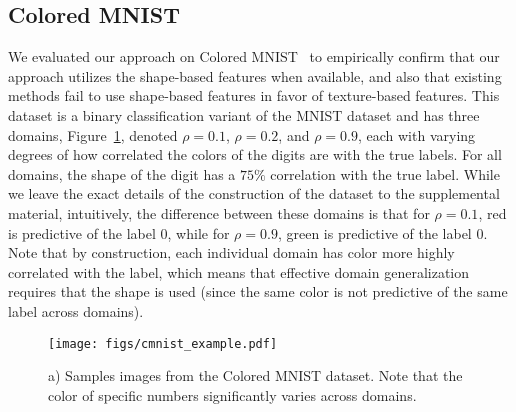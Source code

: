 


















































\subsection{Colored MNIST}

We evaluated our approach on Colored MNIST~\cite{Arjovsky:etal:ARXIV20, Gulrajani:etal:ARXIV20} to empirically confirm that our approach utilizes the shape-based features when available, and also that existing methods fail to use shape-based features in favor of texture-based features. This dataset is a binary classification variant of the MNIST dataset and has three domains, Figure~\ref{fig:cmnist}, denoted $\rho = 0.1$, $\rho = 0.2$, and $\rho = 0.9$, each with varying degrees of how correlated the colors of the digits are with the true labels. For all domains, the shape of the digit has a $75\%$ correlation with the true label. While we leave the exact details of the construction of the dataset to the supplemental material, intuitively, the difference between these domains is that for $\rho = 0.1$, red is predictive of the label 0, while for $\rho = 0.9$, green is predictive of the label 0. Note that by construction, each individual domain has color more highly correlated with the label, which means that effective domain generalization requires that the shape is used (since the same color is not predictive of the same label across domains).






\begin{figure}[!ht]


  \begin{center}
    \texttt{[image: figs/cmnist\_example.pdf]}
    
\end{center}
\caption{a) Samples images from the Colored MNIST dataset. Note that the color of specific numbers significantly varies across domains. }
\label{fig:cmnist}
\end{figure}









